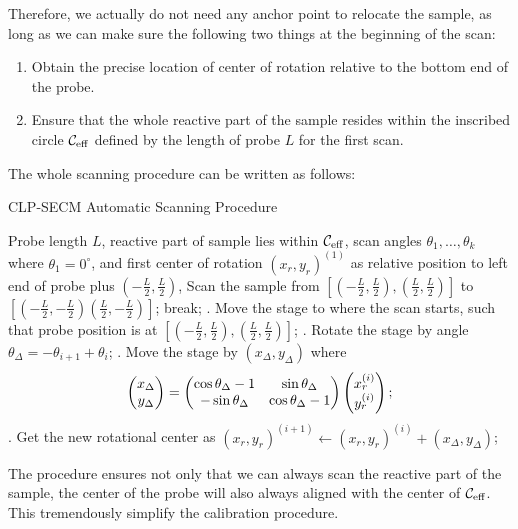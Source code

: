 \documentclass[letter, 10pt]{article}
\numberwithin{equation}{section}
\newcommand{\vsni}{\vspace{.1in} \noindent}
\newcommand{\brac}[1]{\left[ #1 \right]}
\newcommand{\paren}[1]{ \left( #1 \right) }
\newcommand{\1}{\mathbf 1}
\begin{document}
\vsni Therefore, we actually do not need any anchor point to relocate the sample, as long as we can make sure the following two things  at the beginning of the scan:
\begin{enumerate}
	\item Obtain the precise location of center of rotation relative to the bottom end of the probe.
	\item Ensure that the whole reactive part of the sample resides within the inscribed circle $\mathcal C_{\mathrm{eff}}$ defined by the length of probe $L$ for the first scan.
\end{enumerate}

\vsni The whole scanning procedure can be written as follows: 

\begin{algorithm}
	\caption{CLP-SECM Automatic Scanning Procedure}
	
	\begin{algorithmic}
		\Require  Probe length $L$, reactive part of sample lies within $\mathcal C_{\mathrm{eff}}$, scan angles $\theta_1,\ldots,\theta_k$ where $\theta_1 = 0^\circ$, and first center of rotation $(x_r,y_r)^{(1)}$ as relative position to left end of probe plus $\paren{-\frac L2,\frac L2}$,
			\State Scan the sample from $\brac{\paren{-\frac L 2,\frac L 2},\paren{\frac L 2,\frac L   2}}$ to $\brac{\paren{-\frac L 2,-\frac L 2}\paren{\frac L 2,-\frac L 2}}$;
				\State break;
			\Else 
			. Move the stage to where the scan starts, such that probe position is at $\brac{\paren{-\frac{L}{2},\frac{L}{2}},\paren{\frac{L}2,\frac{L}2} }$;
			. Rotate the stage by angle $\theta_\Delta = -\theta_{i+1} + \theta_i$;
			. Move the stage by $(x_\Delta,y_\Delta)$ where 
			\begin{align}
				\begin{pmatrix}
				x_\Delta \\ y_\Delta
				\end{pmatrix} = \begin{pmatrix}
				\cos\theta_\Delta-1 &\sin\theta_\Delta \\ -\sin\theta_\Delta & \cos\theta_\Delta-1
				\end{pmatrix}\begin{pmatrix}
				  x_r^{(i)} \\  y_r^{(i)}
				\end{pmatrix}; \notag 
			\end{align}
			. Get the new rotational center as $(x_r,y_r)^{(i+1)} \gets(x_r,y_r)^{(i)} + (x_\Delta,y_\Delta) $;
			\EndIf
		\EndFor
	\end{algorithmic}
\end{algorithm}

\vsni The procedure ensures not only that we can always scan the reactive part of the sample, the center of the probe will also always aligned with the center of $\mathcal C_{\mathrm{eff}}$. This tremendously simplify the calibration procedure.









\end{document}
